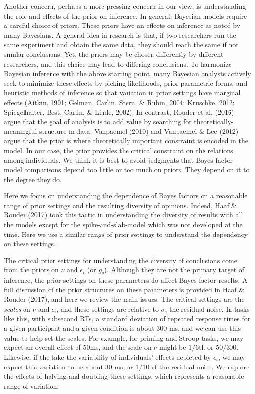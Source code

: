 \documentclass[english,man]{apa6}
\theoremstyle{definition}
\theoremstyle{definition}
\theoremstyle{remark}
\begin{document}
Another concern, perhaps a more pressing concern in our view, is
understanding the role and effects of the prior on inference. In
general, Bayesian models require a careful choice of priors. These
priors have an effects on inference as noted by many Bayesians. A
general idea in research is that, if two researchers run the same
experiment and obtain the same data, they should reach the same if not
similar conclusions. Yet, the priors may be chosen differently by
different researchers, and this choice may lead to differing
conclusions. To harmonize Bayesian inference with the above starting
point, many Bayesian analysts actively seek to minimize these effects by
picking likelihoods, prior parametric forms, and heuristic methods of
inference so that variation in prior settings have marginal effects
(Aitkin, 1991; Gelman, Carlin, Stern, \& Rubin, 2004; Kruschke, 2012;
Spiegelhalter, Best, Carlin, \& Linde, 2002). In contrast, Rouder et al.
(2016) argue that the goal of analysis is to add value by searching for
theoretically-meaningful structure in data. Vanpaemel (2010) and
Vanpaemel \& Lee (2012) argue that the prior is where theoretically
important constraint is encoded in the model. In our case, the prior
provides the critical constraint on the relations among individuals. We
think it is best to avoid judgments that Bayes factor model comparisons
depend too little or too much on priors. They depend on it to the degree
they do.

Here we focus on understanding the dependence of Bayes factors on a
reasonable range of prior settings and the resulting diversity of
opinions. Indeed, Haaf \& Rouder (2017) took this tactic in
understanding the diversity of results with all the models except for
the spike-and-slab-model which was not developed at the time. Here we
use a similar range of prior settings to understand the dependency on
these settings.

The critical prior settings for understanding the diversity of
conclusions come from the priors on \(\nu\) and \(\epsilon_i\) (or
\(g_\theta\)). Although they are not the primary target of inference,
the prior settings on these parameters do affect Bayes factor results. A
full discussion of the prior structures on these parameters is provided
in Haaf \& Rouder (2017), and here we review the main issues. The
critical settings are the \emph{scales} on \(\nu\) and \(\epsilon_i\),
and these settings are relative to \(\sigma\), the residual noise. In
tasks like this, with subsecond RTs, a standard deviation of repeated
response times for a given participant and a given condition is about
300 ms, and we can use this value to help set the scales. For example,
for priming and Stroop tasks, we may expect an overall effect of 50ms,
and the scale on \(\nu\) might be \(1/6\)th or \(50/300\). Likewise, if
the take the variability of individuals' effects depicted by
\(\epsilon_i\), we may expect this variation to be about 30 ms, or
\(1/10\) of the residual noise. We explore the effects of halving and
doubling these settings, which represents a reasonable range of
variation.
\end{document}
